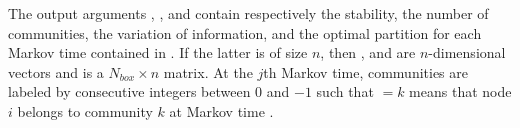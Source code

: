 The output arguments , ,  and  contain respectively the stability, the number of communities, the variation of information, and the optimal partition for each Markov time contained in . If the latter is of size $n$, then ,  and  are $n$-dimensional vectors and  is a $N_{box} \times n$ matrix. At the $j$th Markov time, communities are labeled by consecutive integers between $0$ and $-1$ such that  $= k$ means that node $i$ belongs to community $k$ at Markov time .  